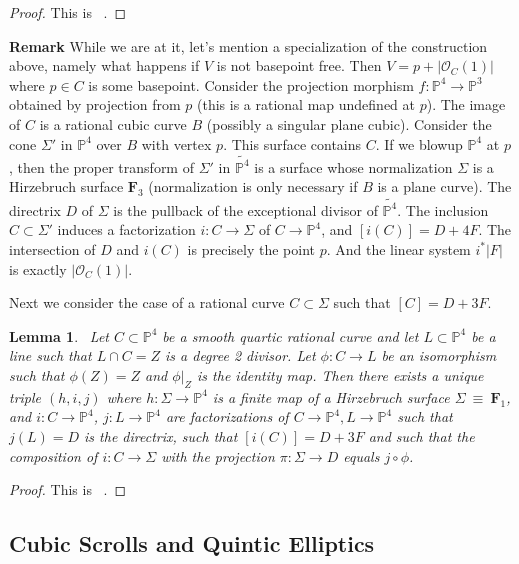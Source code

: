 \documentclass[amssymb,twoside,12 pt,amscd,reqno]{amsart}
\theoremstyle{plain}
\newtheorem{lem}[thm]{Lemma}
\theoremstyle{definition}
\newcommand{\PP}{\mathbb{P}}
\def\ps{\vspace{4pt}}
\newcommand{\OO}{\mathcal O}
\begin{document}
\begin{proof}
This is ~\cite[lemma 6.7]{HRS1}.  
\end{proof}

\textbf{Remark}
While we are at it, let's mention a specialization of the construction
above, namely what happens if $V$ is not basepoint free.  Then
$V=p+|\OO_C(1)|$ where $p\in C$ is some basepoint.  Consider
the projection morphism $f:\PP^4\rightarrow \PP^3$ obtained by
projection from $p$ (this is a rational map undefined at $p$).  The
image of $C$ is a rational cubic curve $B$ (possibly a singular plane
cubic).  Consider the cone $\Sigma'$ in $\PP^4$ over $B$ with vertex
$p$.  This 
surface contains $C$.  If we blowup $\PP^4$ at $p$, then the proper
transform of $\Sigma'$ in $\widetilde{\PP^4}$ is a surface whose
normalization $\Sigma$ is a 
Hirzebruch surface $\mathbf{F}_3$ (normalization is only necessary if
$B$ is a plane curve).  The directrix $D$ of $\Sigma$ is the pullback of
the exceptional divisor of $\widetilde{\PP^4}$.  The inclusion
$C\subset \Sigma'$ induces a factorization $i:C\rightarrow \Sigma$ of
$C\rightarrow \PP^4$, and $[i(C)] = D + 4F$.  The intersection of $D$
and $i(C)$ is precisely the point $p$.  And the linear system $i^*|F|$
is exactly $|\OO_C(1)|$.  

\ps

Next we consider the case of a rational curve $C\subset \Sigma$ such
that $[C]=D+3F$.  

\begin{lem}~\label{lem-scr40}  
Let $C\subset \PP^4$ be a smooth quartic rational curve 
and let $L\subset \PP^4$ be a line such that $L\cap C=Z$ is a degree 2
divisor.  
Let $\phi:C\rightarrow L$ be an isomorphism such that $\phi(Z)=Z$ and
$\phi|_Z$ is the identity map.  Then there exists a unique triple
$(h,i,j)$ where $h:\Sigma\rightarrow \PP^4$ is a finite map of a 
Hirzebruch surface $\Sigma~\equiv~\mathbf{F}_1$, and 
$i:C\rightarrow\PP^4$, $j:L\rightarrow\PP^4$ are factorizations of
$C\rightarrow \PP^4,L\rightarrow \PP^4$
such that $j(L)=D$ is the directrix, such that $[i(C)]=D+3F$ and such
that the composition of $i:C\rightarrow \Sigma$ with the projection
$\pi:\Sigma\rightarrow D$ equals $j\circ \phi$.  
\end{lem}

\begin{proof}
This is ~\cite[lemma 6.8]{HRS1}.
\end{proof}

\subsection{Cubic Scrolls and Quintic Elliptics}~\label{subsec-scr51}
\end{document}

